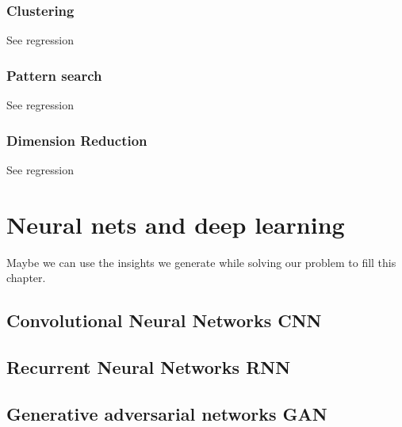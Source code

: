 \documentclass[a4paper,titlepage]{article}
\numberwithin{equation}{section} %
\begin{document}
\subsubsection{Clustering}
See regression
 

\subsubsection{Pattern search}
See regression

\subsubsection{Dimension Reduction}
See regression

 


\newpage


\section{Neural nets and deep learning}
Maybe we can use the insights we generate while solving our problem to fill this chapter.



\subsection{Convolutional Neural Networks CNN}



\subsection{Recurrent Neural Networks RNN}


\subsection{Generative adversarial networks GAN}
\end{document}
